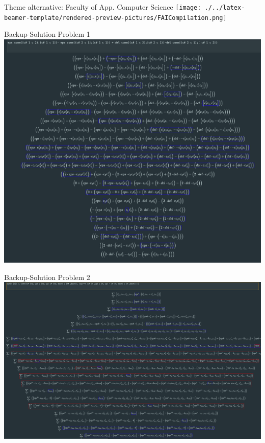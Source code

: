 
\begin{frame}[noframenumbering]{Theme alternative: Faculty of App. Computer Science}
    \hspace{1cm}\texttt{[image: ./../latex-beamer-template/rendered-preview-pictures/FAICompilation.png]}
\end{frame}


\begin{frame}[noframenumbering]{Backup-Solution Problem 1}
    \hspace{2cm}\includegraphics[height=.72\paperheight]{./math-manipulator-calculations/fkp_page_15_backup_solution.png}
\end{frame}

\begin{frame}[noframenumbering]{Backup-Solution Problem 2}
    \hspace{0.6cm}\includegraphics[height=.72\paperheight]{./math-manipulator-calculations/fkp_page_33_backup_solution.png}
\end{frame}